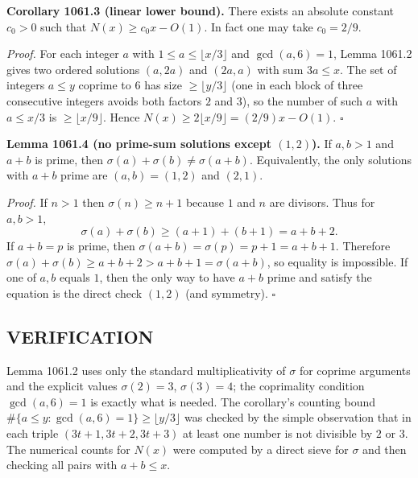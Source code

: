 \medskip
\textbf{Corollary 1061.3 (linear lower bound).}
There exists an absolute constant $c_0>0$ such that $N(x)\ge c_0 x - O(1)$.
In fact one may take $c_0=2/9$.

\emph{Proof.}
For each integer $a$ with $1\le a\le \lfloor x/3\rfloor$ and $\gcd(a,6)=1$, Lemma 1061.2 gives two ordered solutions $(a,2a)$ and $(2a,a)$ with sum $3a\le x$.
The set of integers $a\le y$ coprime to $6$ has size $\ge \lfloor y/3\rfloor$ (one in each block of three consecutive integers avoids both factors $2$ and $3$), so the number of such $a$ with $a\le x/3$ is $\ge \lfloor x/9\rfloor$.
Hence $N(x)\ge 2\lfloor x/9\rfloor = (2/9)x - O(1)$. \hfill$\square$

\medskip
\textbf{Lemma 1061.4 (no prime-sum solutions except $(1,2)$).}
If $a,b>1$ and $a+b$ is prime, then $\sigma(a)+\sigma(b)\ne \sigma(a+b)$. Equivalently, the only solutions with $a+b$ prime are $(a,b)=(1,2)$ and $(2,1)$.

\emph{Proof.}
If $n>1$ then $\sigma(n)\ge n+1$ because $1$ and $n$ are divisors. Thus for $a,b>1$,
\[
\sigma(a)+\sigma(b)\ge (a+1)+(b+1)=a+b+2.
\]
If $a+b=p$ is prime, then $\sigma(a+b)=\sigma(p)=p+1=a+b+1$. Therefore $\sigma(a)+\sigma(b)\ge a+b+2> a+b+1=\sigma(a+b)$, so equality is impossible.
If one of $a,b$ equals $1$, then the only way to have $a+b$ prime and satisfy the equation is the direct check $(1,2)$ (and symmetry). \hfill$\square$

\subsection*{VERIFICATION}
Lemma 1061.2 uses only the standard multiplicativity of $\sigma$ for coprime arguments and the explicit values $\sigma(2)=3$, $\sigma(3)=4$; the coprimality condition $\gcd(a,6)=1$ is exactly what is needed.
The corollary's counting bound $\#\{a\le y:\gcd(a,6)=1\}\ge \lfloor y/3\rfloor$ was checked by the simple observation that in each triple $(3t+1,3t+2,3t+3)$ at least one number is not divisible by $2$ or $3$.
The numerical counts for $N(x)$ were computed by a direct sieve for $\sigma$ and then checking all pairs with $a+b\le x$.

